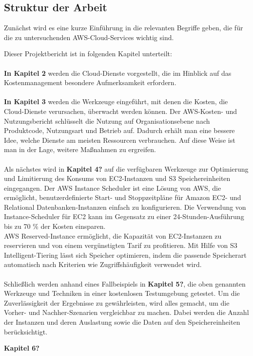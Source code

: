 \subsection{Struktur der Arbeit}
Zunächst wird es eine kurze Einführung in die relevanten Begriffe geben, die für die zu untersuchenden AWS-Cloud-Services wichtig sind.

Dieser Projektbericht ist in folgenden Kapitel unterteilt:\\\\
\textbf{In Kapitel 2} werden die Cloud-Dienste vorgestellt, die im Hinblick auf das Kostenmanagement besondere Aufmerksamkeit erfordern.
\\\\
\textbf{In Kapitel 3} werden die Werkzeuge eingeführt, mit denen die Kosten, die Cloud-Dienste verursachen, überwacht werden können. Der AWS-Kosten- und Nutzungsbericht schlüsselt die Nutzung auf Organisationsebene nach Produktcode, Nutzungsart und Betrieb auf. Dadurch erhält man eine bessere Idee, welche Dienste am meisten Ressourcen verbrauchen. Auf diese Weise ist man in der Lage, weitere Maßnahmen zu ergreifen.
\\\\
Als nächstes wird in \textbf{Kapitel 4?} auf die verfügbaren Werkzeuge zur Optimierung und Limitierung des Konsums von EC2-Instanzen und S3 Speichereinheiten eingegangen. Der AWS Instance Scheduler ist eine Lösung von AWS, die ermöglicht, benutzerdefinierte Start- und Stoppzeitpläne für Amazon EC2- und Relational Datenbanken-Instanzen einfach zu konfigurieren. Die Verwendung von Instance-Scheduler für EC2 kann im Gegensatz zu einer 24-Stunden-Ausführung bis zu 70 \% der Kosten einsparen.
\\
AWS Reserved-Instance ermöglicht, die Kapazität von EC2-Instanzen zu reservieren und von einem vergünstigten Tarif zu profitieren. Mit Hilfe von S3 Intelligent-Tiering lässt sich Speicher optimieren, indem die passende Speicherart automatisch nach Kriterien wie Zugriffshäufigkeit verwendet wird.
\\\\
Schließlich werden anhand eines Fallbeispiels in \textbf{Kapitel 5?}, die oben genannten Werkzeuge und Techniken in einer kostenlosen Testumgebung getestet. Um die Zuverlässigkeit der Ergebnisse zu gewährleisten, wird alles gemacht, um die Vorher- und Nachher-Szenarien vergleichbar zu machen. Dabei werden die Anzahl der Instanzen und deren Auslastung sowie die Daten auf den Speichereinheiten berücksichtigt.
 
\textbf{Kapitel 6?} 
\\
